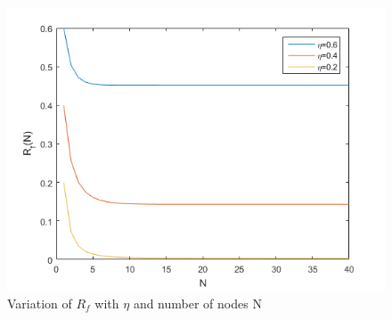  \begin{figure}[!ht]
\includegraphics[scale=0.75]{./pics/computation_complexity.png}
\caption{Variation of $R_f$ with $\eta$ and number of nodes N \cite{cordella1999performance}}
\label{fig:compl}
\end{figure}

%

